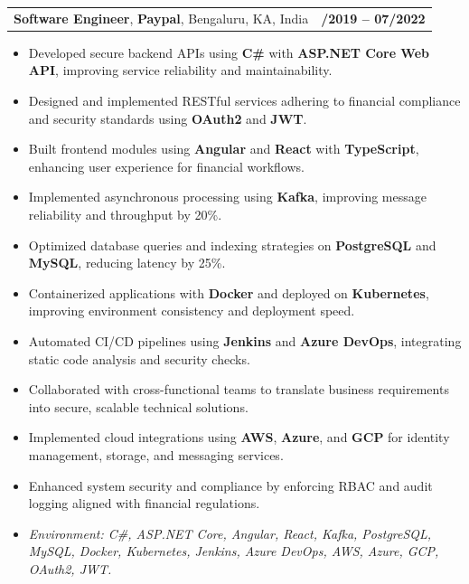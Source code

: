 \documentclass[letterpaper,11pt]{article}
\makeatletter
\newcommand{\resumeItem}[1]{
  \item\footnotesize{
    {#1 \vspace{-2pt}}
  }
}
\newcommand{\resumeSubheading}[4]{
  \vspace{-2pt}\item
    \begin{tabular*}{1.0\textwidth}[t]{l@{\extracolsep{\fill}}r}
      \textbf{\fontsize{10pt}{14pt}\selectfont #3}, \textbf{\fontsize{10pt}{14pt}\selectfont #1}, \fontsize{10pt}{14pt}\selectfont #4 & \textbf{\fontsize{10pt}{14pt}\selectfont #2} \\
    \end{tabular*}\vspace{-7pt}
}
\newcommand{\resumeItemListStart}{\begin{itemize}[leftmargin=*]}
\newcommand{\resumeItemListEnd}{\end{itemize}\vspace{-5pt}}
\makeatother
\begin{document}
\resumeSubheading
{Paypal}{08/2019 -- 07/2022}
{Software Engineer}{Bengaluru, KA, India}
\resumeItemListStart
  \resumeItem{Developed secure backend APIs using \textbf{C\#} with \textbf{ASP.NET Core Web API}, improving service reliability and maintainability.}
  \resumeItem{Designed and implemented RESTful services adhering to financial compliance and security standards using \textbf{OAuth2} and \textbf{JWT}.}
  \resumeItem{Built frontend modules using \textbf{Angular} and \textbf{React} with \textbf{TypeScript}, enhancing user experience for financial workflows.}
  \resumeItem{Implemented asynchronous processing using \textbf{Kafka}, improving message reliability and throughput by 20\%.}
  \resumeItem{Optimized database queries and indexing strategies on \textbf{PostgreSQL} and \textbf{MySQL}, reducing latency by 25\%.}
  \resumeItem{Containerized applications with \textbf{Docker} and deployed on \textbf{Kubernetes}, improving environment consistency and deployment speed.}
  \resumeItem{Automated CI/CD pipelines using \textbf{Jenkins} and \textbf{Azure DevOps}, integrating static code analysis and security checks.}
  \resumeItem{Collaborated with cross-functional teams to translate business requirements into secure, scalable technical solutions.}
  \resumeItem{Implemented cloud integrations using \textbf{AWS}, \textbf{Azure}, and \textbf{GCP} for identity management, storage, and messaging services.}
  \resumeItem{Enhanced system security and compliance by enforcing RBAC and audit logging aligned with financial regulations.}
  \resumeItem{\textit{Environment: C\#, ASP.NET Core, Angular, React, Kafka, PostgreSQL, MySQL, Docker, Kubernetes, Jenkins, Azure DevOps, AWS, Azure, GCP, OAuth2, JWT.}}
\resumeItemListEnd
\end{document}
